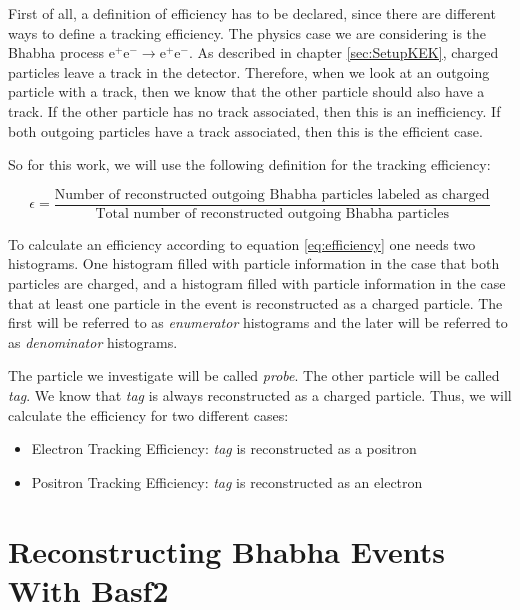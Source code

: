 \documentclass[a4paper,11pt,twosided,final,german,openbib,pdftex,listof=totoc,bibliography=totoc]{scrbook}
\begin{document}
First of all, a definition of efficiency has to be declared, since there are different ways to define a tracking efficiency. The physics case we are considering is the Bhabha process $ \textrm{e}^+ \textrm{e}^- \rightarrow \textrm{e}^+ \textrm{e}^- $. As described in chapter \ref{sec:SetupKEK}, charged particles leave a track in the detector. Therefore, when we look at an outgoing particle with a track, then we know that the other particle should also have a track. If the other particle has no track associated, then this is an inefficiency. If both outgoing particles have a track associated, then this is the efficient case.

So for this work, we will use the following definition for the tracking efficiency:

\begin{equation}
	\epsilon = \frac{\textrm{Number of reconstructed outgoing Bhabha particles labeled as charged}}{\textrm{Total number of reconstructed outgoing Bhabha particles}}
	\label{eq:efficiency}
\end{equation}


To calculate an efficiency according to equation \ref{eq:efficiency} one needs two histograms. One histogram filled with particle information in the case that both particles are charged, and a histogram filled with particle information in the case that at least one particle in the event is reconstructed as a charged particle. The first will be referred to as \textit{enumerator} histograms and the later will be referred to as \textit{denominator} histograms.


The particle we investigate will be called \textit{probe}. The other particle will be called \textit{tag}. We know that \textit{tag} is always reconstructed as a charged particle. Thus, we will calculate the efficiency for two different cases:

\begin{itemize}
	
	\item Electron Tracking Efficiency: \textit{tag} is reconstructed as a positron
	\item Positron Tracking Efficiency: \textit{tag} is reconstructed as an electron
\end{itemize}

\section{Reconstructing Bhabha Events With Basf2}
\label{sec:RecBasf2}
\end{document}
